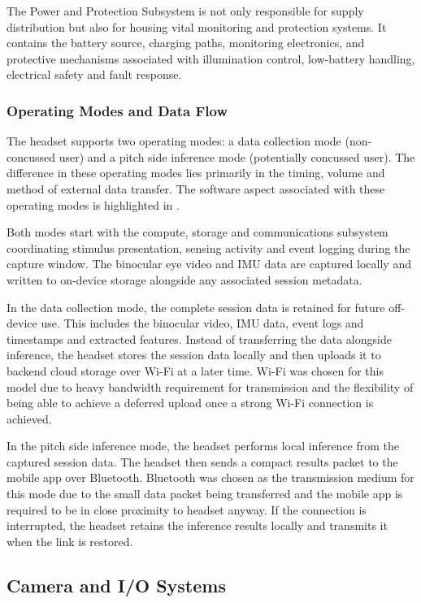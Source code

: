 The Power and Protection Subsystem is not only responsible for supply distribution but also for housing vital monitoring and protection systems. It contains the battery source, charging paths, monitoring electronics, and protective mechanisms associated with illumination control, low-battery handling, electrical safety and fault response.

\subsubsection{Operating Modes and Data Flow}

The headset supports two operating modes: a data collection mode (non-concussed user) and a pitch side inference mode (potentially concussed user). The difference in these operating modes lies primarily in the timing, volume and method of external data transfer. The software aspect associated with these operating modes is highlighted in .

Both modes start with the compute, storage and communications subsystem coordinating stimulus presentation, sensing activity and event logging during the capture window. The binocular eye video and IMU data are captured locally and written to on-device storage alongside any associated session metadata.

In the data collection mode, the complete session data is retained for future off-device use. This includes the binocular video, IMU data, event logs and timestamps and extracted features. Instead of transferring the data alongside inference, the headset stores the session data locally and then uploads it to backend cloud storage over Wi-Fi at a later time. Wi-Fi was chosen for this model due to heavy bandwidth requirement for transmission and the flexibility of being able to achieve a deferred upload once a strong Wi-Fi connection is achieved.

In the pitch side inference mode, the headset performs local inference from the captured session data. The headset then sends a compact results packet to the mobile app over Bluetooth. Bluetooth was chosen as the transmission medium for this mode due to the small data packet being transferred and the mobile app is required to be in close proximity to headset anyway. If the connection is interrupted, the headset retains the inference results locally and transmits it when the link is restored.


\subsection{Camera and I/O Systems}

